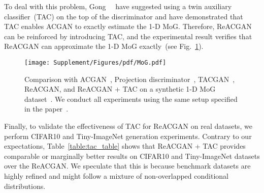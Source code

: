 \documentclass{article}
\begin{document}
To deal with this problem, Gong~\etal~\cite{NIPS2019_8414} have suggested using a twin auxiliary classifier~(TAC) on the top of the discriminator and have demonstrated that TAC enables ACGAN to exactly estimate the 1-D MoG. Therefore, ReACGAN can be reinforced by introducing TAC, and the experimental result verifies that ReACGAN can approximate the 1-D MoG exactly~(see Fig.~\ref{fig:MoG-TAC}).
\clearpage
\begin{figure}[t!]
    \centering
    \texttt{[image: Supplement/Figures/pdf/MoG.pdf]}
    \caption{Comparison with ACGAN~\cite{Odena2017ConditionalIS}, Projection discriminator~\cite{Miyato2018cGANsWP}, TACGAN~\cite{NIPS2019_8414}, ReACGAN, and ReACGAN + TAC on a synthetic 1-D MoG dataset~\cite{NIPS2019_8414}. We conduct all experiments using the same setup specified in the paper~\cite{NIPS2019_8414}.}
    \label{fig:MoG-TAC}
\end{figure} \begin{table}[h!]
\centering
\caption{Experiments to identify the effectiveness of ReACGAN with TAC~\cite{NIPS2019_8414} on CIFAR10~\cite{Krizhevsky2009LearningML} and Tiny-ImageNet~\cite{Tiny} datasets.}
\setlength\tabcolsep{4.0pt}
\vspace{2mm}
\label{table:tac_table}
\end{table} Finally, to validate the effectiveness of TAC for ReACGAN on real datasets, we perform CIFAR10 and Tiny-ImageNet generation experiments. Contrary to our expectations, Table~\ref{table:tac_table} shows that ReACGAN + TAC provides comparable or marginally better results on CIFAR10 and Tiny-ImageNet datasets over the ReACGAN. We speculate that this is because benchmark datasets are highly refined and might follow a mixture of non-overlapped conditional distributions.
\end{document}
